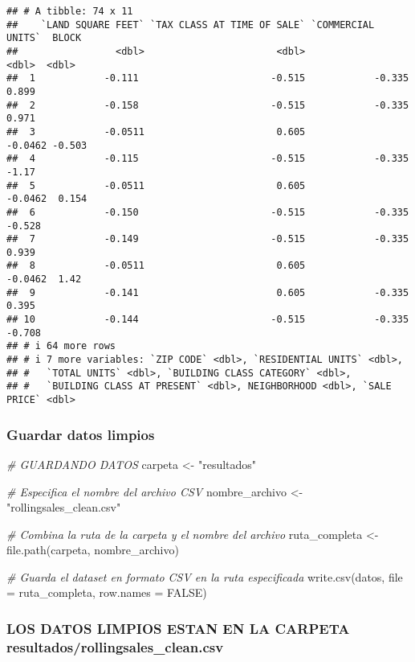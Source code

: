 \documentclass[
]{article}
\newenvironment{Shaded}{\begin{snugshade}}{\end{snugshade}}
\newcommand{\AttributeTok}[1]{\textcolor[rgb]{0.77,0.63,0.00}{#1}}
\newcommand{\CommentTok}[1]{\textcolor[rgb]{0.56,0.35,0.01}{\textit{#1}}}
\newcommand{\ConstantTok}[1]{\textcolor[rgb]{0.00,0.00,0.00}{#1}}
\newcommand{\FunctionTok}[1]{\textcolor[rgb]{0.00,0.00,0.00}{#1}}
\newcommand{\NormalTok}[1]{#1}
\newcommand{\OtherTok}[1]{\textcolor[rgb]{0.56,0.35,0.01}{#1}}
\newcommand{\StringTok}[1]{\textcolor[rgb]{0.31,0.60,0.02}{#1}}
\begin{document}
\begin{verbatim}
## # A tibble: 74 x 11
##    `LAND SQUARE FEET` `TAX CLASS AT TIME OF SALE` `COMMERCIAL UNITS`  BLOCK
##                 <dbl>                       <dbl>              <dbl>  <dbl>
##  1            -0.111                       -0.515            -0.335   0.899
##  2            -0.158                       -0.515            -0.335   0.971
##  3            -0.0511                       0.605            -0.0462 -0.503
##  4            -0.115                       -0.515            -0.335  -1.17 
##  5            -0.0511                       0.605            -0.0462  0.154
##  6            -0.150                       -0.515            -0.335  -0.528
##  7            -0.149                       -0.515            -0.335   0.939
##  8            -0.0511                       0.605            -0.0462  1.42 
##  9            -0.141                        0.605            -0.335   0.395
## 10            -0.144                       -0.515            -0.335  -0.708
## # i 64 more rows
## # i 7 more variables: `ZIP CODE` <dbl>, `RESIDENTIAL UNITS` <dbl>,
## #   `TOTAL UNITS` <dbl>, `BUILDING CLASS CATEGORY` <dbl>,
## #   `BUILDING CLASS AT PRESENT` <dbl>, NEIGHBORHOOD <dbl>, `SALE PRICE` <dbl>
\end{verbatim}

\hypertarget{guardar-datos-limpios}{%
\subsubsection{Guardar datos limpios}\label{guardar-datos-limpios}}

\begin{Shaded}
\begin{Highlighting}[]
\CommentTok{\# GUARDANDO DATOS}
\NormalTok{carpeta }\OtherTok{\textless{}{-}} \StringTok{"resultados"}

\CommentTok{\# Especifica el nombre del archivo CSV}
\NormalTok{nombre\_archivo }\OtherTok{\textless{}{-}} \StringTok{"rollingsales\_clean.csv"}

\CommentTok{\# Combina la ruta de la carpeta y el nombre del archivo}
\NormalTok{ruta\_completa }\OtherTok{\textless{}{-}} \FunctionTok{file.path}\NormalTok{(carpeta, nombre\_archivo)}

\CommentTok{\# Guarda el dataset en formato CSV en la ruta especificada}
\FunctionTok{write.csv}\NormalTok{(datos, }\AttributeTok{file =}\NormalTok{ ruta\_completa, }\AttributeTok{row.names =} \ConstantTok{FALSE}\NormalTok{)}
\end{Highlighting}
\end{Shaded}

\hypertarget{los-datos-limpios-estan-en-la-carpeta-resultadosrollingsales_clean.csv}{%
\subsubsection{LOS DATOS LIMPIOS ESTAN EN LA CARPETA
resultados/rollingsales\_clean.csv}\label{los-datos-limpios-estan-en-la-carpeta-resultadosrollingsales_clean.csv}}
\end{document}
